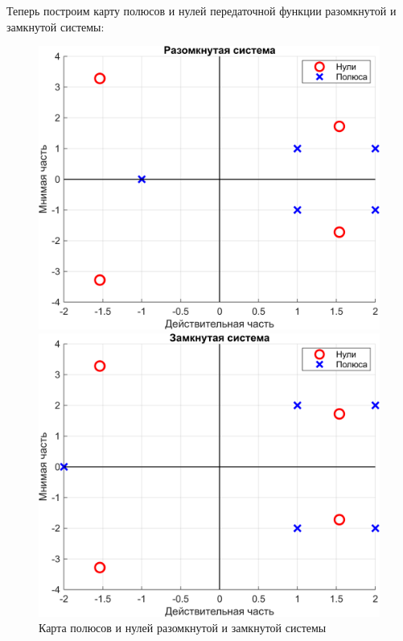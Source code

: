 Теперь построим карту полюсов и нулей передаточной функции разомкнутой и замкнутой системы:
\begin{figure}[H]
    \centering
    \begin{minipage}{0.45\textwidth}
        \centering
        \includegraphics[width=1\textwidth, trim={0cm 0cm 0cm 0cm}]{../images/1_1_map_ol.png}
    \end{minipage}
    \hfill
    \begin{minipage}{0.45\textwidth}
        \centering
        \includegraphics[width=1\textwidth, trim={0cm 0cm 0cm 0cm}]{../images/1_1_map_cl.png}
    \end{minipage}
    \caption{Карта полюсов и нулей разомкнутой и замкнутой системы}
\end{figure}

